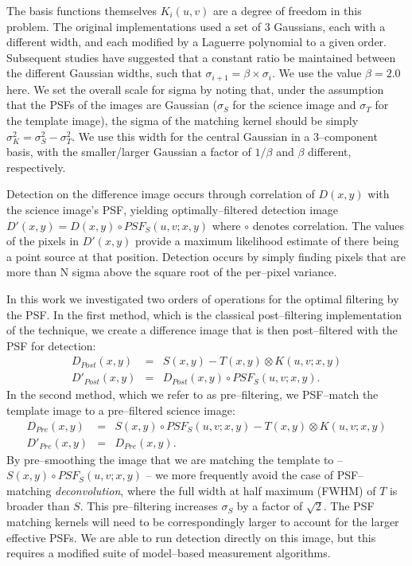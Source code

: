\documentclass[floatfix, apj]{emulateapj}
\begin{document}
The basis functions themselves $K_i(u,v)$ are a degree of freedom in this problem.
The original implementations \citep{Alard98,Alard00} used a set of 3 Gaussians, each with a different width, and each modified by a Laguerre polynomial to a given order.
Subsequent studies \citep[e.g.][]{2007AN....328...16I} have suggested that a constant ratio be maintained between the different Gaussian widths, such that $\sigma_{i+1} = \beta \times \sigma_{i}$.  
We use the value $\beta = 2.0$ here.
We set the overall scale for sigma by noting that, under the assumption that the PSFs of the images are Gaussian ($\sigma_S$ for the science image and $\sigma_T$ for the template image), the sigma of the matching kernel should be simply $\sigma_K^2 = \sigma_S^2 - \sigma_T^2$.
We use this width for the central Gaussian in a 3--component basis, with the smaller/larger Gaussian a factor of $1/\beta$ and $\beta$ different, respectively.

Detection on the difference image occurs through correlation of $D(x,y)$ with the science image's PSF, yielding optimally--filtered detection image $D'(x,y) = D(x,y) \circ PSF_S(u,v;x,y)$ where $\circ$ denotes correlation.
The values of the pixels in $D'(x,y)$ provide a maximum likelihood estimate of there being a point source at that position.
Detection occurs by simply finding pixels that are more than N sigma above the square root of the per--pixel variance.

In this work we investigated two orders of operations for the optimal filtering by the PSF.
In the first method, which is the classical post--filtering implementation of the technique, we create a difference image that is then post--filtered with the PSF for detection:
\begin{eqnarray}
D_{Post}(x,y) & = & S(x,y) - T(x,y) \otimes K(u,v;x,y)  \nonumber \\
D'_{Post}(x,y) & = & D_{Post}(x,y) \circ PSF_S(u,v;x,y).  \nonumber
\end{eqnarray}
In the second method, which we refer to as pre--filtering, we PSF--match the template image to a pre--filtered science image:
\begin{eqnarray}
D_{Pre}(x,y) & = & S(x,y) \circ PSF_S(u,v;x,y) - T(x,y) \otimes K(u,v;x,y) \nonumber \\
D'_{Pre}(x,y) & = & D_{Pre}(x,y). \nonumber
\end{eqnarray}
By pre--smoothing the image that we are matching the template to -- $S(x,y) \circ PSF_S(u,v;x,y)$ -- we more frequently avoid the case of PSF--matching {\it deconvolution}, where the full width at half maximum (FWHM) of $T$ is broader than $S$.
This pre--filtering increases $\sigma_S$ by a factor of $\sqrt{2}$.
The PSF matching kernels will need to be correspondingly larger to account for the larger effective PSFs.
We are able to run detection directly on this image, but this requires a modified suite of model--based measurement algorithms.
\end{document}
